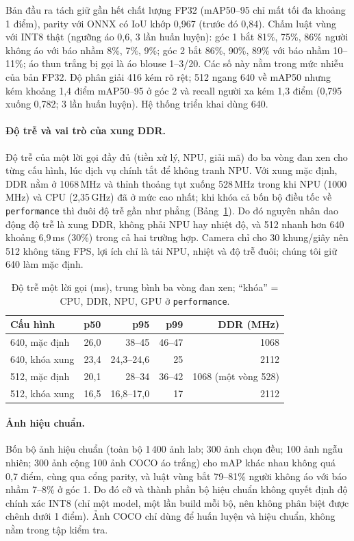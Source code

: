 \documentclass[12pt,a4paper]{article}
\begin{document}
Bản đầu ra tách giữ gần hết chất lượng FP32 (mAP50--95 chỉ mất tối đa khoảng 1 điểm), parity với ONNX có IoU khớp
0,967 (trước đó 0,84). Chấm luật vùng với INT8 thật (ngưỡng áo 0,6, 3 lần huấn luyện): góc 1 bắt 81\%, 75\%, 86\% người
không áo với báo nhầm 8\%, 7\%, 9\%; góc 2 bắt 86\%, 90\%, 89\% với báo nhầm 10--11\%; áo thun trắng bị gọi là áo blouse
1--3/20. Các số này nằm trong mức nhiễu của bản FP32. Độ phân giải 416 kém rõ rệt; 512 ngang 640 về mAP50 nhưng kém khoảng 1,4 điểm mAP50--95 ở góc 2 và recall người xa kém 1,3 điểm
(0,795 xuống 0,782; 3 lần huấn luyện). Hệ thống triển khai dùng 640.

\paragraph{Độ trễ và vai trò của xung DDR.} Độ trễ của một lời gọi đầy đủ (tiền xử lý, NPU, giải mã) đo ba vòng đan xen cho từng cấu hình, lúc dịch vụ
chính tắt để không tranh NPU. Với xung mặc định, DDR nằm ở 1068\,MHz và thỉnh thoảng tụt xuống 528\,MHz trong khi NPU (1000\,MHz) và CPU (2,35\,GHz) đã ở
mức cao nhất; khi khóa cả bốn bộ điều tốc về \texttt{performance} thì đuôi độ trễ gần như phẳng (Bảng~\ref{tab:lat}). Do đó nguyên nhân dao động độ trễ là xung DDR,
không phải NPU hay nhiệt độ, và 512 nhanh hơn 640 khoảng 6,9\,ms (30\%) trong cả hai trường hợp. Camera chỉ cho 30 khung/giây nên 512 không tăng FPS,
lợi ích chỉ là tải NPU, nhiệt và độ trễ đuôi; chúng tôi giữ 640 làm mặc định.

\begin{table}[ht]
\centering
\caption{Độ trễ một lời gọi (ms), trung bình ba vòng đan xen; ``khóa'' = CPU, DDR, NPU, GPU ở \texttt{performance}.}
\label{tab:lat}
\small
\begin{tabular}{lrrrr}
\toprule
Cấu hình & p50 & p95 & p99 & DDR (MHz) \\
\midrule
640, mặc định & 26,0 & 38--45 & 46--47 & 1068 \\
640, khóa xung & 23,4 & 24,3--24,6 & 25 & 2112 \\
512, mặc định & 20,1 & 28--34 & 36--42 & 1068 (một vòng 528) \\
512, khóa xung & 16,5 & 16,8--17,0 & 17 & 2112 \\
\bottomrule
\end{tabular}
\end{table}

\paragraph{Ảnh hiệu chuẩn.} Bốn bộ ảnh hiệu chuẩn (toàn bộ 1\,400 ảnh lab; 300 ảnh chọn đều; 100 ảnh ngẫu nhiên; 300 ảnh cộng 100 ảnh COCO áo trắng) cho mAP khác nhau
không quá 0,7 điểm, cùng qua cổng parity, và luật vùng bắt 79--81\% người không áo với báo nhầm 7--8\% ở góc 1. Do đó cỡ và thành phần bộ hiệu chuẩn không quyết
định độ chính xác INT8 (chỉ một model, một lần build mỗi bộ, nên không phân biệt được chênh dưới 1 điểm). Ảnh COCO chỉ dùng để huấn luyện và hiệu chuẩn, không nằm trong tập kiểm tra.
\end{document}
